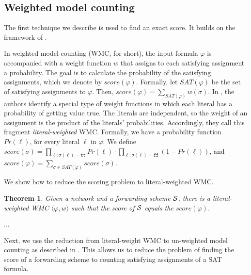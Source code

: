 \documentclass[11pt,eepic]{article}
\newcommand{\zug}[1]{\langle #1  \rangle}
\newcommand{\stam}[1]{}
\renewcommand{\S}{{\cal S}}
\renewcommand{\tt}{\texttt{tt}}
\newcommand{\ff}{\texttt{ff}}
\newtheorem{theorem}{Theorem}[section]
\def\eod{\vrule height 6pt width 5pt depth 0pt}
\newenvironment{proof}{\noindent {\bf Proof:} \hspace{.677em}}
	                      {\hspace*{\fill}{\eod}}
\begin{document}
	\subsection{Weighted model counting}
		\label{sec:WMC}
		The first technique we describe is used to find an exact score. It builds on the framework of \cite{CFMV15}.
		\stam{
		@inproceedings{CFMV15,
		  author    = {Supratik Chakraborty and
		               Dror Fried and
		               Kuldeep S. Meel and
		               Moshe Y. Vardi},
		  title     = {From Weighted to Unweighted Model Counting},
		  booktitle = {Proceedings of the Twenty-Fourth International Joint Conference on
		               Artificial Intelligence, {IJCAI} 2015, Buenos Aires, Argentina, July
		               25-31, 2015},
		  pages     = {689--695},
		  year      = {2015},
		}
		}
		In weighted model counting (WMC, for short), the input formula $\varphi$ is accompanied with a weight function $w$ that assigns to each satisfying assignment a probability. The goal is to calculate the probability of the satisfying assignments, which we denote by $score(\varphi)$. Formally, let $SAT(\varphi)$ be the set of satisfying assignments to $\varphi$. Then, $score(\varphi) = \sum_{SAT(\varphi)} w(\sigma)$. In \cite{CFMV15}, the authors identify a special type of weight functions in which each literal has a probability of getting value true. The literals are independent, so the weight of an assignment is the product of the literals' probabilities. Accordingly, they call this fragment {\em literal-weighted} WMC. Formally, we have a probability function $Pr(\ell)$, for every literal $\ell$ in $\varphi$. We define $score(\sigma) = \prod_{\ell: \sigma(\ell) = \tt} Pr(\ell) \cdot \prod_{\ell: \sigma(\ell) = \ff} (1-Pr(\ell))$, and $score(\varphi) = \sum_{\sigma \in SAT(\varphi)} score(\sigma)$.

		We show how to reduce the scoring problem to literal-weighted WMC.
		\begin{theorem}
		\label{thm:literal WMC}
		Given a network and a forwarding scheme $\S$, there is a literal-weighted WMC $\zug{\varphi, w}$ such that the score of $\S$ equals the $score(\varphi)$.
		\end{theorem}
		\begin{proof}
		...
		\end{proof}

		Next, we use the reduction from literal-weight WMC to un-weighted model counting as described in \cite{CFMV15}. This allows us to reduce the problem of finding the score of a forwarding scheme to counting satisfying assignments of a SAT formula.
\end{document}
